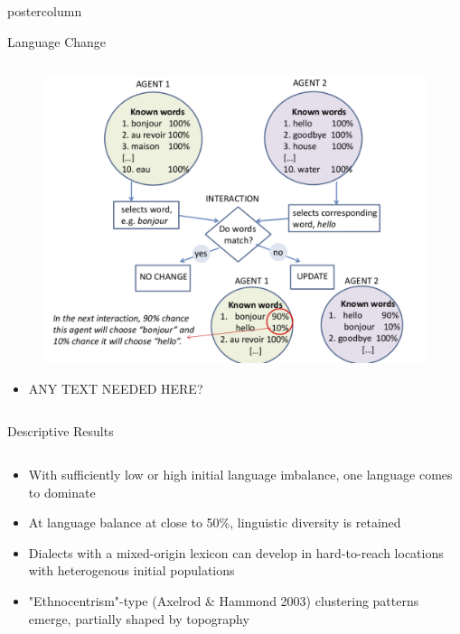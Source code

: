 \documentclass[final,hyperref={pdfpagelabels=false}]{beamer}
\begin{document}
\begin{frame}
\begin{columns}
\begin{column}{.33\textwidth}
\begin{beamercolorbox}[center,wd=\textwidth]{postercolumn}
\begin{minipage}[T]{.95\textwidth}
{            \begin{block}{Language Change}
              \begin{columns}
                \begin{column}{.99\textwidth}
                  \begin{figure}
                    \centering
                    \includegraphics[width=0.80\linewidth]{images/language_change_model}
                  \end{figure}
                  \begin{itemize}
                    \item ANY TEXT NEEDED HERE?
                  \end{itemize}
                \end{column}
              \end{columns}
            \end{block}
            \begin{block}{Descriptive Results}
              \begin{columns}
                \begin{column}{.99\textwidth}
                  \begin{itemize}
                    \item With sufficiently low or high initial language imbalance, one language comes to dominate
                    \item At language balance at close to 50\%, linguistic diversity is retained
                    \item Dialects with a mixed-origin lexicon can develop in hard-to-reach locations with heterogenous initial populations
                    \item "Ethnocentrism"-type (Axelrod \& Hammond 2003) clustering patterns emerge, partially shaped by topography

\end{itemize}
\end{column}
\end{columns}
\end{block}}
\end{minipage}
\end{beamercolorbox}
\end{column}
\end{columns}
\end{frame}
\end{document}

